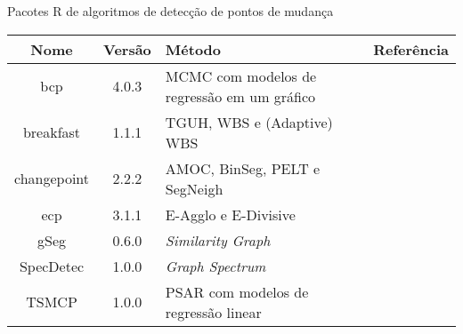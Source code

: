 \begin{quadro}[hbp]
\centering
\caption{Pacotes R de algoritmos de detecção de pontos de mudança \label{qua:ferramentas-cpd}}
    \begin{adjustbox}{max width=\textwidth}
    \begin{tabular}{ | c | c | p{5cm} | p{5cm} | } \hline
        \textbf{Nome}     & \textbf{Versão}      & \textbf{Método}     & \textbf{Referência} \\ \hline
        bcp & 4.0.3 & MCMC com modelos de regressão em um
gráfico & \cite{Emerson2007} \\ \hline
        breakfast & 1.1.1 & TGUH, WBS e (Adaptive) WBS & \cite{Fryzlewicz2017} \\ \hline
        changepoint & 2.2.2 & AMOC, BinSeg, PELT e SegNeigh & \cite{Eckley2016} \\ \hline
        ecp & 3.1.1 & E-Agglo e E-Divisive & \cite{Matteson2014} \\ \hline
        gSeg & 0.6.0 & \textit{Similarity Graph} & \cite{Chen2019} \\ \hline
        SpecDetec & 1.0.0 & \textit{Graph Spectrum} & \cite{Uzai2018} \\ \hline
        TSMCP & 1.0.0 & PSAR com modelos de regressão linear & \cite{Jin2018} \\ \hline 
    \end{tabular}
    \end{adjustbox}
\end{quadro}